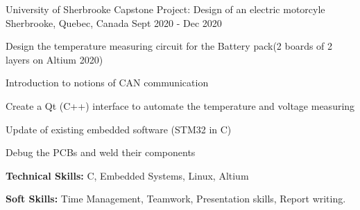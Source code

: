

\begin{cventries}

  \cventry
    {University of Sherbrooke} %
    {Capstone Project: Design of an electric motorcyle} %
    {Sherbrooke, Quebec, Canada} %
    {Sept 2020 - Dec 2020} %
    {
      \begin{cvitems} %
\item Design the temperature measuring circuit for the Battery pack(2 boards of 2 layers on Altium 2020)
\item Introduction to notions of CAN communication
\item Create a Qt (C++) interface to automate the temperature and voltage measuring
\item Update of existing embedded software (STM32 in C)
\item Debug the PCBs and weld their components
        \item {\textbf{Technical Skills:} C, Embedded Systems, Linux, Altium}
        \item {\textbf{Soft Skills:} Time Management, Teamwork, Presentation skills, Report writing.}
      \end{cvitems}
    }


\end{cventries}
